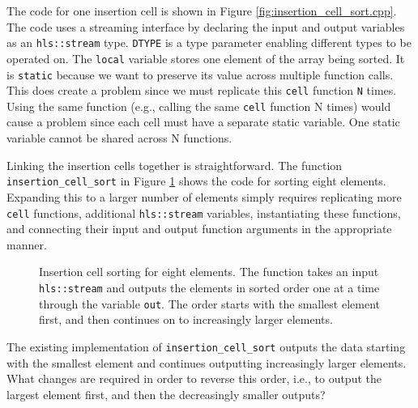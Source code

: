 The code for one insertion cell is shown in Figure \ref{fig:insertion_cell_sort.cpp}. The code uses a streaming interface by declaring the input and output variables as an \lstinline{hls::stream} type. \lstinline{DTYPE} is a type parameter enabling different types to be operated on. The \lstinline{local} variable stores one element of the array being sorted. It is \lstinline{static} because we want to preserve its value across multiple function calls. This does create a problem since we must replicate this \lstinline{cell} function \lstinline{N} times.  Using the same function (e.g., calling the same \lstinline{cell} function N times) would cause a problem since each cell must have a separate static variable.  One static variable cannot be shared across N functions.

%


Linking the insertion cells together is straightforward. The function \lstinline{insertion_cell_sort} in Figure \ref{fig:partial_insertion_cell_sort.cpp} shows the code for sorting eight elements. Expanding this to a larger number of elements simply requires replicating more \lstinline{cell} functions, additional \lstinline{hls::stream} variables, instantiating these functions, and connecting their input and output function arguments in the appropriate manner.

\begin{figure}

\caption{  Insertion cell sorting for eight elements. The function takes an input \lstinline{hls::stream} and outputs the elements in sorted order one at a time through the variable \lstinline{out}. The order starts with the smallest element first, and then continues on to increasingly larger elements. }
\label{fig:partial_insertion_cell_sort.cpp}
\end{figure}

\begin{exercise}
The existing implementation of \lstinline{insertion_cell_sort} outputs the data starting with the smallest element and continues outputting increasingly larger elements. What changes are required in order to reverse this order, i.e., to output the largest element first, and then the decreasingly smaller outputs? 
\end{exercise}

